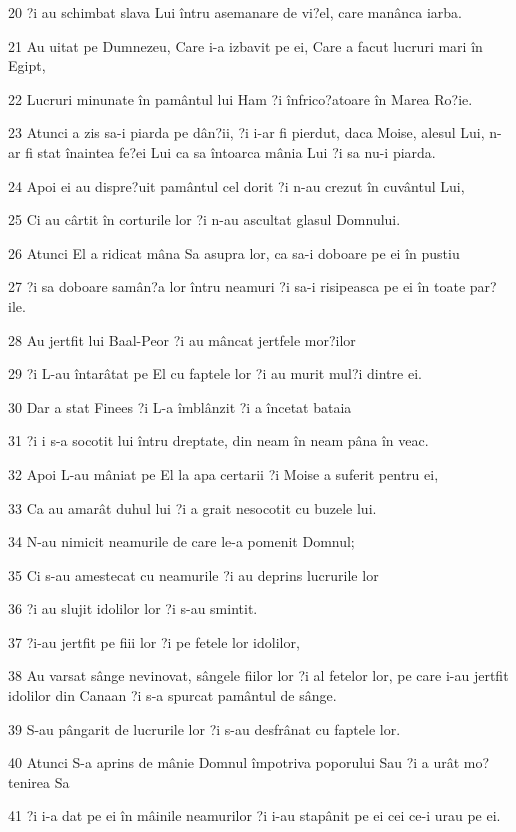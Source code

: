 \par 20 ?i au schimbat slava Lui întru asemanare de vi?el, care manânca iarba.
\par 21 Au uitat pe Dumnezeu, Care i-a izbavit pe ei, Care a facut lucruri mari în Egipt,
\par 22 Lucruri minunate în pamântul lui Ham ?i înfrico?atoare în Marea Ro?ie.
\par 23 Atunci a zis sa-i piarda pe dân?ii, ?i i-ar fi pierdut, daca Moise, alesul Lui, n-ar fi stat înaintea fe?ei Lui ca sa întoarca mânia Lui ?i sa nu-i piarda.
\par 24 Apoi ei au dispre?uit pamântul cel dorit ?i n-au crezut în cuvântul Lui,
\par 25 Ci au cârtit în corturile lor ?i n-au ascultat glasul Domnului.
\par 26 Atunci El a ridicat mâna Sa asupra lor, ca sa-i doboare pe ei în pustiu
\par 27 ?i sa doboare samân?a lor întru neamuri ?i sa-i risipeasca pe ei în toate par?ile.
\par 28 Au jertfit lui Baal-Peor ?i au mâncat jertfele mor?ilor
\par 29 ?i L-au întarâtat pe El cu faptele lor ?i au murit mul?i dintre ei.
\par 30 Dar a stat Finees ?i L-a îmblânzit ?i a încetat bataia
\par 31 ?i i s-a socotit lui întru dreptate, din neam în neam pâna în veac.
\par 32 Apoi L-au mâniat pe El la apa certarii ?i Moise a suferit pentru ei,
\par 33 Ca au amarât duhul lui ?i a grait nesocotit cu buzele lui.
\par 34 N-au nimicit neamurile de care le-a pomenit Domnul;
\par 35 Ci s-au amestecat cu neamurile ?i au deprins lucrurile lor
\par 36 ?i au slujit idolilor lor ?i s-au smintit.
\par 37 ?i-au jertfit pe fiii lor ?i pe fetele lor idolilor,
\par 38 Au varsat sânge nevinovat, sângele fiilor lor ?i al fetelor lor, pe care i-au jertfit idolilor din Canaan ?i s-a spurcat pamântul de sânge.
\par 39 S-au pângarit de lucrurile lor ?i s-au desfrânat cu faptele lor.
\par 40 Atunci S-a aprins de mânie Domnul împotriva poporului Sau ?i a urât mo?tenirea Sa
\par 41 ?i i-a dat pe ei în mâinile neamurilor ?i i-au stapânit pe ei cei ce-i urau pe ei.
